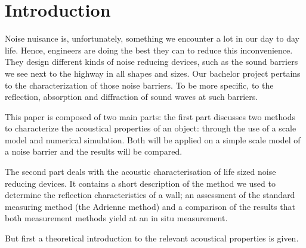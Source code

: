 \section{Introduction}
Noise nuisance is, unfortunately, something we encounter a lot in our day to day life. Hence, engineers are doing the best they can to reduce this inconvenience. They design different kinds of noise reducing devices, such as the sound barriers we see next to the highway in all shapes and sizes. Our bachelor project pertains to the characterization of those noise barriers. To be more specific, to the reflection, absorption and diffraction of sound waves at such barriers.

This paper is composed of two main parts: the first part discusses two methods to characterize the acoustical properties of an object: through the use of a scale model and numerical simulation. Both will be applied on a simple scale model of a noise barrier and the results will be compared.

The second part deals with the acoustic characterisation of life sized noise reducing devices. It contains a short description of the method we used to determine the reflection characteristics of a wall; an assessment of the standard measuring method (the Adrienne method) and a comparison of the results that both measurement methods yield at an in situ measurement.

But first a theoretical introduction to the relevant acoustical properties is given.
